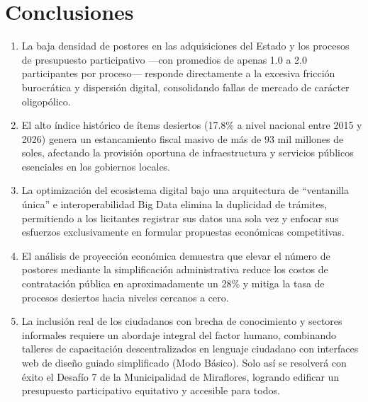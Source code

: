 \documentclass[12pt,a4paper]{article}
\begin{document}
\newpage

\section*{Conclusiones}

\begin{enumerate}
    \item La baja densidad de postores en las adquisiciones del Estado y los procesos de presupuesto participativo ---con promedios de apenas 1.0 a 2.0 participantes por proceso--- responde directamente a la excesiva fricción burocrática y dispersión digital, consolidando fallas de mercado de carácter oligopólico.
    \item El alto índice histórico de ítems desiertos (17.8\% a nivel nacional entre 2015 y 2026) genera un estancamiento fiscal masivo de más de 93 mil millones de soles, afectando la provisión oportuna de infraestructura y servicios públicos esenciales en los gobiernos locales.
    \item La optimización del ecosistema digital bajo una arquitectura de ``ventanilla única'' e interoperabilidad Big Data elimina la duplicidad de trámites, permitiendo a los licitantes registrar sus datos una sola vez y enfocar sus esfuerzos exclusivamente en formular propuestas económicas competitivas.
    \item El análisis de proyección económica demuestra que elevar el número de postores mediante la simplificación administrativa reduce los costos de contratación pública en aproximadamente un 28\% y mitiga la tasa de procesos desiertos hacia niveles cercanos a cero.
    \item La inclusión real de los ciudadanos con brecha de conocimiento y sectores informales requiere un abordaje integral del factor humano, combinando talleres de capacitación descentralizados en lenguaje ciudadano con interfaces web de diseño guiado simplificado (Modo Básico). Solo así se resolverá con éxito el Desafío 7 de la Municipalidad de Miraflores, logrando edificar un presupuesto participativo equitativo y accesible para todos.
\end{enumerate}

\newpage

\end{document}
